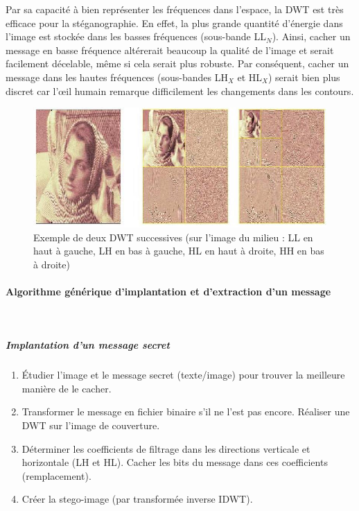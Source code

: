 Par sa capacité à bien représenter les fréquences dans l'espace, la DWT est très efficace pour la stéganographie. En effet, la plus grande quantité d'énergie dans l'image est stockée dans les basses fréquences (sous-bande LL$_{N}$). Ainsi, cacher un message en basse fréquence altérerait beaucoup la qualité de l'image et serait facilement décelable, même si cela serait plus robuste. Par conséquent, cacher un message dans les hautes fréquences (sous-bandes LH$_{X}$ et HL$_{X}$) serait bien plus discret car l'\oe il humain remarque difficilement les changements dans les contours.\\

\begin{figure}[h]
\centering
\includegraphics[width=\linewidth]{images/dwt-exemple.jpg}
\caption{Exemple de deux DWT successives (sur l'image du milieu : LL en haut à gauche, LH en bas à gauche, HL en haut à droite, HH en bas à droite)}
\end{figure}

\paragraph{Algorithme générique d'implantation et d'extraction d'un message}~\\\indent
\subparagraph{Implantation d'un message secret}
\begin{enumerate}
\item Étudier l'image et le message secret (texte/image) pour trouver la meilleure manière de le cacher.
\item Transformer le message en fichier binaire s'il ne l'est pas encore. Réaliser une DWT sur l'image de couverture.
\item Déterminer les coefficients de filtrage dans les directions verticale et horizontale (LH et HL). Cacher les bits du message dans ces coefficients (remplacement).
\item Créer la stego-image (par transformée inverse IDWT).
\end{enumerate}

